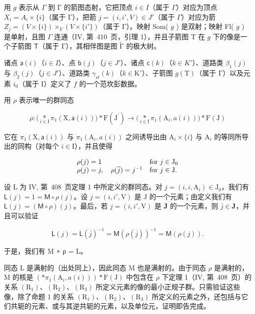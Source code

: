 用 \(g\) 表示从 \(\Gamma\) 到 \(\textsf{Γ}\) 的箭图态射，它把顶点 \(i \in I\)（属于 \(\Gamma\)）对应为顶点 \(X_i = A_i \times \{i\}\)（属于 \(\textsf{Γ}\)），把箭 \(j = (i, i', V) \in J'\)（属于 \(\Gamma\)）对应为箭 \(Z_j = (V \times \{i\}) \times_Y(V \times \{i'\})\)（属于 \(\textsf{Γ}\)）。映射 Som( \(g\) ) 是双射；映射 Fl( \(g\) ) 是单射，且图 \(\Gamma\) 连通（IV, 第~410~页，引理 1），并且子箭图 T 在 \(g\) 下的像是一个子箭图 \(\mathsf{T}\)（属于 \(\textsf{Γ}\)），其相伴图是图 \(\widetilde{\textsf{Γ}}\) 的极大树。

诸点 \(\mathsf{a}(i)\)（\(i \in I\)）、点 \(\mathsf{b}(j)\)（\(j \in J'\)）、诸点 \(\mathsf{c}(k)\)（\(k \in K'\)）、道路类 \(\beta_{1}(j)\) 与 \(\beta_{2}(j)\)（\(j \in J'\)）、道路类 \(\gamma_{st}(k)\)（\(k \in \mathrm{K}'\)）、子箭图 \(g(\mathrm{T})\)（属于 \(\textsf{Γ}\)）以及元素 \(i_0\)（属于 I）定义了 \(f\) 的一个范坎彭数据。

用 \(\rho\) 表示唯一的群同态

\[
\rho \colon \big (\underset {i \in \mathrm{I}} {*} \pi_ {1} (\mathrm{X}, \mathsf {a} (i)) \big) * \mathrm{F} (\mathrm{J} ^ {\prime}) \to \big (\underset {i \in \mathrm{I}} {*} \pi_ {1} (\mathrm{A} _ {i}, a (i)) \big) * \mathrm{F} (\mathrm{J})
\]

它在 \(\pi_1(\mathrm{X},\mathsf{a}(i))\) 与 \(\pi_1(\mathrm{A}_i,a(i))\) 之间诱导出由 \(\mathrm{A}_i\times \{i\}\) 与 \(\mathrm{A}_i\) 的等同所导出的同构（对每个 \(i\in \mathrm{I}\)），并且使得

\[
\begin{array}{l l} \rho (j) = 1 & \text {for } j \in \mathrm{J} _ {0} \\ \rho (j) = j, \quad \rho (\overline {{j}}) = j ^ {- 1} & \text {for } j \in \mathrm{J}. \end{array}
\]

设 L 为 IV, 第~408~页定理 1 中所定义的群同态。对 \(j = (i, i, \mathrm{A}_i) \in \mathrm{J}_0\)，我们有 \(\mathsf{L}(j) = 1 = \mathsf{M} \circ \rho(j)\)。设 \(j = (i, i', \mathrm{V})\) 是 J 的一个元素；由定义我们有 \(\mathsf{L}(j) = (\mathsf{M} \circ \rho)(j)\)。最后，若 \(j = (i, i', \mathrm{V})\) 是 \(\overline{\mathbf{J}}\) 的一个元素，则 \(\overline{j} \in \mathbf{J}\)，并且可以验证

\[
\mathsf {L} (j) = \mathsf {L} (\overline {{j}}) ^ {- 1} = \mathsf {M} (\rho (\overline {{j}})) ^ {- 1} = \mathsf {M} (\rho (j)).
\]

于是，我们有 M ∘ ρ = L。

同态 L 是满射的（出处同上），因此同态 M 也是满射的。由于同态 \(\rho\) 是满射的，M 的核是 \(\left(\ast\pi_{1}(\mathrm{A}_{i},a(i))\right)*\mathrm{F}(\mathrm{J})\) 中包含在 \(\rho\) 下定理 1（IV, 第~408~页）的关系 \((\mathrm{R}_{1})\)、\((\mathrm{R}_{2})\)、\((\mathrm{R}_{3})\) 所定义元素的像的最小正规子群。只需验证这些像，除了命题 1 的关系 \((\mathrm{R}_{1})\)、\((\mathrm{R}_{2})\)、\((\mathrm{R}_{3})\) 所定义的元素之外，还包括与它们共轭的元素、或与其逆共轭的元素，以及单位元，证明即告完成。

